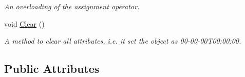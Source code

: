 \begin{DoxyCompactItemize}
\begin{DoxyCompactList}\small\item\em An overloading of the assignment operator. \end{DoxyCompactList}\item 
\mbox{\label{structTimeData_af1071330f0fadc98a5e08d41a8436907}} 
void \hyperlink{structTimeData_af1071330f0fadc98a5e08d41a8436907}{Clear} ()
\begin{DoxyCompactList}\small\item\em A method to clear all attributes, i.\+e. it set the object as 00-\/00-\/00\+T00\+:00\+:00. \end{DoxyCompactList}\end{DoxyCompactItemize}
\subsection*{Public Attributes}
